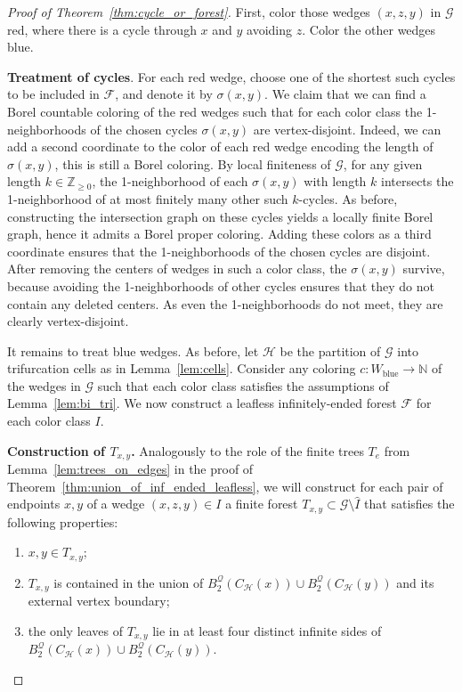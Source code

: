 \documentclass{article}
\theoremstyle{plain}
\theoremstyle{definition}
\newcommand{\Z}{\mathbb{Z}}
\newcommand{\N}{\mathbb{N}}
\newcommand{\cG}{\mathcal{G}}
\newcommand{\cF}{\mathcal{F}}
\newcommand{\cH}{\mathcal{H}}
\begin{document}
\begin{proof}[Proof of Theorem~\ref{thm:cycle_or_forest}]

First, color those wedges $(x,z,y)$ in $\cG$ red, where there is a cycle through $x$ and $y$ avoiding $z$. Color the other wedges blue. 


\textbf{Treatment of cycles}.
For each red wedge, choose one of the shortest such cycles to be included in $\cF$, and denote it by $\sigma(x,y)$. We claim that we can find a Borel countable coloring of the red wedges such that for each color class the 1-neighborhoods of the chosen cycles $\sigma(x,y)$ are vertex-disjoint. Indeed, we can add a second coordinate to the color of each red wedge encoding the length of $\sigma(x,y)$, this is still a Borel coloring. By local finiteness of $\cG$, for any given length $k\in\Z_{\ge0}$, the 1-neighborhood of each $\sigma(x,y)$ with length $k$ intersects the 1-neighborhood of at most finitely many other such $k$-cycles. As before, constructing the intersection graph on these cycles yields a locally finite Borel graph, hence it admits a Borel proper coloring. Adding these colors as a third coordinate ensures that the 1-neighborhoods of the chosen cycles are disjoint. After removing the centers of wedges in such a color class, the $\sigma(x,y)$ survive, because avoiding the 1-neighborhoods of other cycles ensures that they do not contain any deleted centers. As even the 1-neighborhoods do not meet, they are clearly vertex-disjoint.

It remains to treat blue wedges. As before, let $\cH$ be the partition of $\cG$ into trifurcation cells as in Lemma~\ref{lem:cells}. Consider any coloring $c:W_{\textrm{blue}} \to \N$ of the wedges in $\cG$ such that each color class satisfies the assumptions of Lemma~\ref{lem:bi_tri}. We now construct a leafless infinitely-ended forest $\mathcal{F}$ for each color class $I$.

{\bf Construction of $T_{x,y}$.}  Analogously to the role of the finite trees $T_e$ from Lemma~\ref{lem:trees_on_edges} in the proof of Theorem~\ref{thm:union_of_inf_ended_leafless}, we will construct for each pair of endpoints $x,y$ of a wedge $(x,z,y)\in I$ a finite forest $T_{x,y}\subset \cG\setminus{\widehat{I}}$ that satisfies the following properties:
     \begin{enumerate}
         \item $x,y\in T_{x,y}$;
         \item $T_{x,y}$ is contained in the union of $B_2^{\mathcal{Q}}(C_{\cH}(x))\cup B_2^{\mathcal{Q}}(C_{\cH}(y))$ and its external vertex boundary;
         \item the only leaves of $T_{x,y}$ lie in at least four distinct infinite sides of $B_2^{\mathcal{Q}}(C_{\cH}(x))\cup B_2^{\mathcal{Q}}(C_{\cH}(y))$.
     \end{enumerate}


\end{proof}
\end{document}

